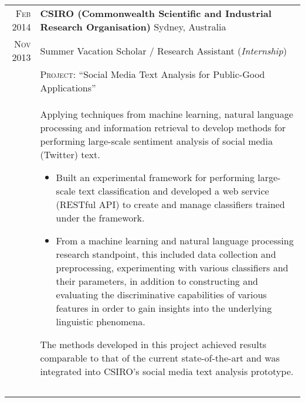 \documentclass[a4paper,10pt]{article} %
\begin{document}
\begin{longtable}{r|p{13.8cm}}
  \textsc{Feb 2014}	& \textbf{CSIRO {\small (Commonwealth Scientific and Industrial 
                      Research Organisation)}} \hfill Sydney, Australia \\
  \textsc{Nov 2013} & Summer Vacation Scholar / Research Assistant 
                      \hfill (\emph{Internship}) \\
  & {\small \textsc{Project}: ``Social Media Text Analysis for 
      Public-Good Applications''}\\
  & {\scriptsize
      Applying techniques from machine learning, natural language processing 
      and information retrieval to develop methods for performing large-scale 
      sentiment analysis of social media (Twitter) text.
      \begin{itemize}
        \item Built an experimental framework for performing large-scale text 
              classification and developed a web service (RESTful API) to create and 
              manage classifiers trained under the framework.
        \item From a machine learning and natural language processing research standpoint, 
              this included data collection and preprocessing, experimenting with various
              classifiers and their parameters, in addition to constructing and evaluating
              the discriminative capabilities of various features in order to gain 
              insights into the underlying linguistic phenomena.
      \end{itemize}
      The methods developed in this project achieved results comparable to that of the 
      current state-of-the-art and was integrated into CSIRO's social media text analysis
      prototype.
    } \\
				
  \multicolumn{2}{c}{} \\

  \newpage
  

\end{longtable}
\end{document}
